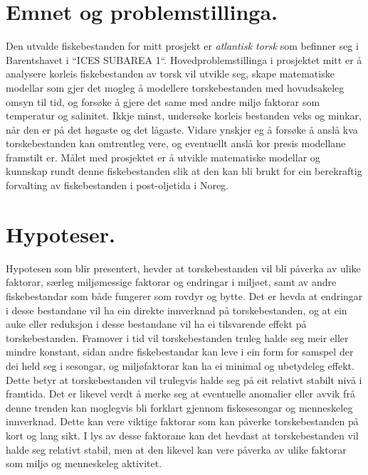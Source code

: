 \documentclass{report}
\begin{document}
\section{Emnet og problemstillinga.}
Den utvalde fiskebestanden for mitt prosjekt er \textit{atlantisk torsk} som befinner seg i Barentshavet i ``ICES SUBAREA 1``.
Hovedproblemstillinga i prosjektet mitt er å analysere korleis fiskebestanden av torsk vil utvikle seg, skape matematiske modellar som gjer det mogleg å modellere torskebestanden med hovudsakeleg omsyn til tid, og forsøke å gjere det same med andre miljø faktorar som temperatur og salinitet.
Ikkje minst, undersøke korleis bestanden veks og minkar, når den er på det høgaste og det lågaste.
Vidare ynskjer eg å forsøke å anslå kva torskebestanden kan omtrentleg vere, og eventuellt anslå kor presis modellane framstilt er.
Målet med prosjektet er å utvikle matematiske modellar og kunnskap rundt denne fiskebestanden slik at den kan bli brukt for ein berekraftig forvalting av fiskebestanden i post-oljetida i Noreg.
\section{Hypoteser.}
Hypotesen som blir presentert, hevder at torskebestanden vil bli påverka av ulike faktorar, særleg miljømessige faktorar og endringar i miljøet, samt av andre fiskebestandar som både fungerer som rovdyr og bytte. Det er hevda at endringar i desse bestandane vil ha ein direkte innverknad på torskebestanden, og at ein auke eller reduksjon i desse bestandane vil ha ei tilsvarende effekt på torskebestanden.
Framover i tid vil torskebestanden truleg halde seg meir eller mindre konstant, sidan andre fiskebestandar kan leve i ein form for samspel der dei held seg i sesongar, og miljøfaktorar kan ha ei minimal og ubetydeleg effekt. Dette betyr at torskebestanden vil trulegvis halde seg på eit relativt stabilt nivå i framtida.
Det er likevel verdt å merke seg at eventuelle anomalier eller avvik frå denne trenden kan moglegvis bli forklart gjennom fiskesesongar og menneskeleg innverknad. Dette kan vere viktige faktorar som kan påverke torskebestanden på kort og lang sikt.
I lys av desse faktorane kan det hevdast at torskebestanden vil halde seg relativt stabil, men at den likevel kan vere påverka av ulike faktorar som miljø og menneskeleg aktivitet.
\end{document}
